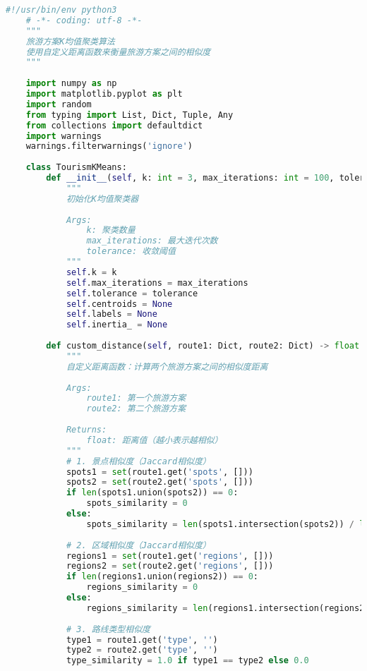 \begin{lstlisting}[language=Python]
    #!/usr/bin/env python3
    # -*- coding: utf-8 -*-
    """
    旅游方案K均值聚类算法
    使用自定义距离函数来衡量旅游方案之间的相似度
    """
    
    import numpy as np
    import matplotlib.pyplot as plt
    import random
    from typing import List, Dict, Tuple, Any
    from collections import defaultdict
    import warnings
    warnings.filterwarnings('ignore')
    
    class TourismKMeans:
        def __init__(self, k: int = 3, max_iterations: int = 100, tolerance: float = 1e-4):
            """
            初始化K均值聚类器
            
            Args:
                k: 聚类数量
                max_iterations: 最大迭代次数
                tolerance: 收敛阈值
            """
            self.k = k
            self.max_iterations = max_iterations
            self.tolerance = tolerance
            self.centroids = None
            self.labels = None
            self.inertia_ = None
            
        def custom_distance(self, route1: Dict, route2: Dict) -> float:
            """
            自定义距离函数：计算两个旅游方案之间的相似度距离
            
            Args:
                route1: 第一个旅游方案
                route2: 第二个旅游方案
                
            Returns:
                float: 距离值（越小表示越相似）
            """
            # 1. 景点相似度（Jaccard相似度）
            spots1 = set(route1.get('spots', []))
            spots2 = set(route2.get('spots', []))
            if len(spots1.union(spots2)) == 0:
                spots_similarity = 0
            else:
                spots_similarity = len(spots1.intersection(spots2)) / len(spots1.union(spots2))
            
            # 2. 区域相似度（Jaccard相似度）
            regions1 = set(route1.get('regions', []))
            regions2 = set(route2.get('regions', []))
            if len(regions1.union(regions2)) == 0:
                regions_similarity = 0
            else:
                regions_similarity = len(regions1.intersection(regions2)) / len(regions1.union(regions2))
            
            # 3. 路线类型相似度
            type1 = route1.get('type', '')
            type2 = route2.get('type', '')
            type_similarity = 1.0 if type1 == type2 else 0.0
            

\end{lstlisting}
